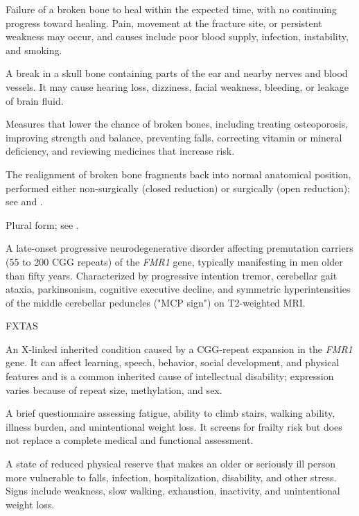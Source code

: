  Failure of a broken bone to heal within the expected time, with no continuing progress toward healing. Pain, movement at the fracture site, or persistent weakness may occur, and causes include poor blood supply, infection, instability, and smoking.

 A break in a skull bone containing parts of the ear and nearby nerves and blood vessels. It may cause hearing loss, dizziness, facial weakness, bleeding, or leakage of brain fluid.

 Measures that lower the chance of broken bones, including treating osteoporosis, improving strength and balance, preventing falls, correcting vitamin or mineral deficiency, and reviewing medicines that increase risk.

 The realignment of broken bone fragments back into normal anatomical position, performed either non-surgically (closed reduction) or surgically (open reduction); see  and .

 Plural form; see .

 A late-onset progressive neurodegenerative disorder affecting premutation carriers (55 to 200 CGG repeats) of the \textit{FMR1} gene, typically manifesting in men older than fifty years. Characterized by progressive intention tremor, cerebellar gait ataxia, parkinsonism, cognitive executive decline, and symmetric hyperintensities of the middle cerebellar peduncles ("MCP sign") on T2-weighted MRI.

\synonyms
FXTAS

 An X-linked inherited condition caused by a CGG-repeat expansion in the \textit{FMR1} gene. It can affect learning, speech, behavior, social development, and physical features and is a common inherited cause of intellectual disability; expression varies because of repeat size, methylation, and sex.

 A brief questionnaire assessing fatigue, ability to climb stairs, walking ability, illness burden, and unintentional weight loss. It screens for frailty risk but does not replace a complete medical and functional assessment.

 A state of reduced physical reserve that makes an older or seriously ill person more vulnerable to falls, infection, hospitalization, disability, and other stress. Signs include weakness, slow walking, exhaustion, inactivity, and unintentional weight loss.

